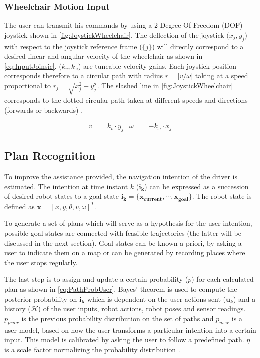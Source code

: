 \subsubsection{Wheelchair Motion Input}
The user can transmit his commands by using a 2 Degree Of Freedom (DOF) joystick shown in \cref{fig:JoystickWheelchair}. The deflection of the joystick $(x_j,y_j$) with respect to the joystick reference frame ($\{j\}$) will directly correspond to a desired linear and angular velocity of the wheelchair as shown in \cref{eq:InputJoinsic}. ($ k_v,k_{\omega}$) are tuneable velocity gains. Each joystick position corresponds therefore to a circular path with radius $r=|v / \omega|$ taking at a speed proportional to $r_j=\sqrt{x^2_j+y^2_j}$. The slashed line in \cref{fig:JoystickWheelchair} corresponds to the dotted circular path taken at different speeds and directions (forwards or backwards) \cite{VanderPoortenEtAl2012}.

\begin{align}
v &= k_v \cdot y_j & \omega &= -k_{\omega} \cdot x_j \label{eq:InputJoinsic}
\end{align}

\subsection{Plan Recognition} \label{sec:PlanRec}
To improve the assistance provided, the navigation intention of the driver is estimated. The intention at time instant $k$ ($\bm{i_k}$) can be expressed as a succession of desired robot states to a goal state $\bm{i_k} = \{\bm{x_{current}}, \cdots,\bm{x_{goal}}\}$. The robot state is defined as $\bm{x} = [x,y,\theta,v,\omega]^T$. 

To generate a set of plans which will serve as a hypothesis for the user intention, possible goal states are connected with feasible trajectories (the latter will be discussed in the next section). Goal states can be known a priori, by asking a user to indicate them on a map or can be generated by recording places where the user stops regularly.

The last step is to assign and update a certain probability ($p$) for each calculated plan as shown in \cref{eq:PathProbUser}. Bayes' theorem is used to compute the posterior probability on $\bm{i_k}$ which is dependent on the user actions sent ($\bm{u}_k$) and a history ($\bm{\mathcal{H}}$) of the user inputs, robot actions, robot poses and sensor readings. $p_{prior}$ is the previous probability distribution on the set of paths and $p_{user}$ is a user model, based on how the user transforms a particular intention into a certain input. This model is calibrated by asking the user to follow a predefined path. $\eta$ is a scale factor normalizing the probability distribution \cite{DemeesterEtAl2012a}.

